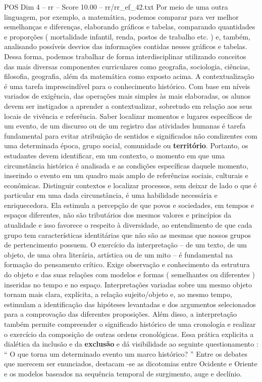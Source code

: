\begin{textsample}{POS Dim 4 – rr – Score 10.00 – rr/rr\_ef\_42.txt}
Por meio de uma outra linguagem, por exemplo, a matemática, podemos comparar para ver melhor semelhanças e diferenças, elaborando gráficos e tabelas, comparando quantidades e proporções ( mortalidade infantil, renda, postos de trabalho etc. ) e, também, analisando possíveis desvios das informações contidas nesses gráficos e tabelas.
Dessa forma, podemos trabalhar de forma interdisciplinar utilizando conceitos das mais diversas componentes curriculares como geografia, sociologia, ciências, filosofia, geografia, além da matemática como exposto acima.
A contextualização é uma tarefa imprescindível para o conhecimento histórico.
Com base em níveis variados de exigência, das operações mais simples às mais elaboradas, os alunos devem ser instigados a aprender a contextualizar, sobretudo em relação aos seus locais de vivência e referência.
Saber localizar momentos e lugares específicos de um evento, de um discurso ou de um registro das atividades humanas é tarefa fundamental para evitar atribuição de sentidos e significados não condizentes com uma determinada época, grupo social, comunidade ou \textbf{território}.
Portanto, os estudantes devem identificar, em um contexto, o momento em que uma circunstância histórica é analisada e as condições específicas daquele momento, inserindo o evento em um quadro mais amplo de referências sociais, culturais e econômicas.
Distinguir contextos e localizar processos, sem deixar de lado o que é particular em uma dada circunstância, é uma habilidade necessária e enriquecedora.
Ela estimula a percepção de que povos e sociedades, em tempos e espaços diferentes, não são tributários dos mesmos valores e princípios da atualidade e isso favorece o respeito à diversidade, ao entendimento de que cada grupo tem características identitárias que não são as mesmas que nossos grupos de pertencimento possuem.
O exercício da interpretação – de um texto, de um objeto, de uma obra literária, artística ou de um mito – é fundamental na formação do pensamento crítico.
Exige observação e conhecimento da estrutura do objeto e das suas relações com modelos e formas ( semelhantes ou diferentes ) inseridas no tempo e no espaço.
Interpretações variadas sobre um mesmo objeto tornam mais clara, explícita, a relação sujeito/objeto e, ao mesmo tempo, estimulam a identificação das hipóteses levantadas e dos argumentos selecionados para a comprovação das diferentes proposições.
Além disso, a interpretação também permite compreender o significado histórico de uma cronologia e realizar o exercício da composição de outras ordens cronológicas.
Essa prática explicita a dialética da inclusão e da \textbf{exclusão} e dá visibilidade ao seguinte questionamento : “ O que torna um determinado evento um marco histórico? ” Entre os debates que merecem ser enunciados, destacam -se as dicotomias entre Ocidente e Oriente e os modelos baseados na sequência temporal de surgimento, auge e declínio.

\end{textsample}

